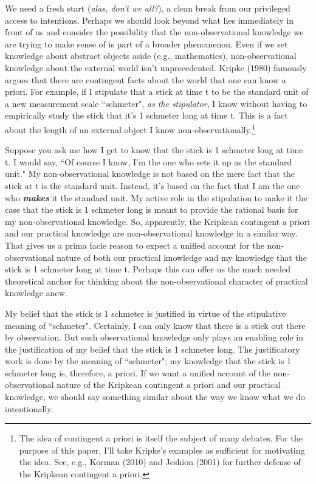 \documentclass[a4paper,12pt]{article}
\begin{document}
We need a fresh start (\emph{alas, don't we all?}), a clean break from our privileged access to intentions. Perhaps we should look beyond what lies immediately in front of us and consider the possibility that the non-observational knowledge we are trying to make sense of is part of a broader phenomenon. Even if we set knowledge about abstract objects aside (e.g., mathematics), non-observational knowledge about the external world isn't unprecedented. Kripke (1980) famously argues that there are contingent facts about the world that one can know a priori. For example, if I stipulate that a stick at time t to be the standard unit of a new measurement scale ``schmeter", \emph{as the stipulator}, I know without having to empirically study the stick that it's 1 schmeter long at time t. This is a fact about the length of an external object I know non-observationally.\footnote{The idea of contingent a priori is itself the subject of many debates. For the purpose of this paper, I'll take Kripke's examples as sufficient for motivating the idea. See, e.g., Korman (2010) and Jeshion (2001) for further defense of the Kripkean contingent a priori.}

Suppose you ask me how I get to know that the stick is 1 schmeter long at time t. I would say, ``Of course I know, I'm the one who sets it up as the standard unit." My non-observational knowledge is not based on the mere fact that the stick at t is the standard unit. Instead, it's based on the fact that I am the one who \emph{\textbf{makes}} it the standard unit. My active role in the stipulation to make it the case that the stick is 1 schmeter long is meant to provide the rational basis for my non-observational knowledge. So, apparently, the Kripkean contingent a priori and our practical knowledge are non-observational knowledge in a similar way. That gives us a prima facie reason to expect a unified account for the non-observational nature of both our practical knowledge and my knowledge that the stick is 1 schmeter long at time t. Perhaps this can offer us the much needed theoretical anchor for thinking about the non-observational character of practical knowledge anew.

My belief that the stick is 1 schmeter is justified in virtue of the stipulative meaning of ``schmeter". Certainly, I can only know that there is a stick out there by observation. But such observational knowledge only plays an enabling role in the justification of my belief that the stick is 1 schmeter long. The justificatory work is done by the meaning of ``schmeter"; my knowledge that the stick is 1 schmeter long is, therefore, a priori. If we want a unified account of the non-observational nature of the Kripkean contingent a priori and our practical knowledge, we should say something similar about the way we know what we do intentionally.
\end{document}

